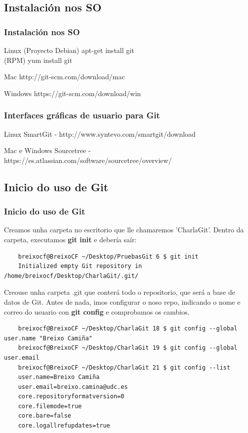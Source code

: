 \subsection{Instalación nos SO}
\begin{frame}
  \frametitle{Instalación nos SO}
  \begin{exampleblock}{Linux}
    (Proyecto Debian) apt-get install git\\
    (RPM) yum install git
  \end{exampleblock}
  \begin{block}{Mac}
    http://git-scm.com/download/mac
  \end{block}
  \begin{alertblock}{Windows}
    https://git-scm.com/download/win
  \end{alertblock}	
\end{frame}

\begin{frame}
  \frametitle{Interfaces gráficas de usuario para Git}
  \begin{exampleblock}{Linux}
    SmartGit - http://www.syntevo.com/smartgit/download
  \end{exampleblock}
  \begin{alertblock}{Mac e Windows}
    Sourcetree - https://es.atlassian.com/software/sourcetree/overview/
  \end{alertblock}
\end{frame}

\subsection{Inicio do uso de Git}
\begin{frame}[fragile]
  \frametitle{Inicio do uso de Git}
  \small
  Creamos unha carpeta no escritorio que lle chamaremos 'CharlaGit'.
  Dentro da carpeta, executamos \textbf{git init} e debería saír:
  \tiny
\begin{verbatim}
	breixocf@BreixoCF ~/Desktop/PruebasGit 6 $ git init 
	Initialized empty Git repository in /home/breixocf/Desktop/CharlaGit/.git/
\end{verbatim}
  \small
  Creouse unha carpeta .git que conterá todo o repositorio, que será a base de datos de Git.
  Antes de nada, imos configurar o noso repo, indicando o nome e correo do usuario con \textbf{git config}  e comprobamos os cambios.
  \tiny
\begin{verbatim}
	breixocf@BreixoCF ~/Desktop/CharlaGit 18 $ git config --global user.name "Breixo Camiña"
	breixocf@BreixoCF ~/Desktop/CharlaGit 19 $ git config --global user.email 
	breixocf@BreixoCF ~/Desktop/CharlaGit 21 $ git config --list 
	user.name=Breixo Camiña
	user.email=breixo.camina@udc.es
	core.repositoryformatversion=0
	core.filemode=true
	core.bare=false
	core.logallrefupdates=true
\end{verbatim}	
\end{frame}


